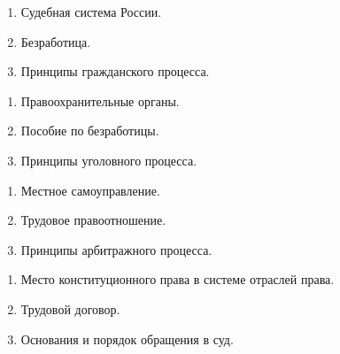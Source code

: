 \newpage


\shapkFull
\setcounter{zad}{0}

\begin{enumerate}
	\item Судебная система России.

	\item Безработица.

	\item Принципы гражданского процесса.

\end{enumerate}

\newpage


\shapkFull
\setcounter{zad}{0}

\begin{enumerate}
	\item Правоохранительные органы.

	\item Пособие по безработицы.

	\item Принципы уголовного процесса.

\end{enumerate}

\newpage


\shapkFull
\setcounter{zad}{0}

\begin{enumerate}
	\item Местное самоуправление.

	\item Трудовое правоотношение.

	\item Принципы арбитражного процесса.

\end{enumerate}

\newpage


\shapkFull
\setcounter{zad}{0}

\begin{enumerate}
	\item Место конституционного права в системе отраслей права.

	\item Трудовой договор.

	\item Основания и порядок обращения в суд.

\end{enumerate}


